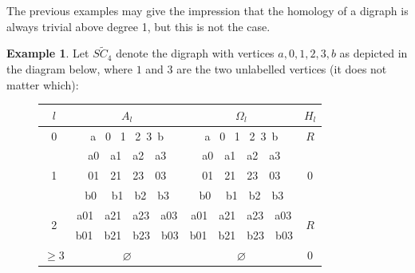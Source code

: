 \documentclass[11pt]{article}
\theoremstyle{definition}
\newtheorem{example}[theo]{Example}
\numberwithin{equation}{section}
\begin{document}
The previous examples may give the impression that the homology of a digraph is always trivial above degree 1, but this is not the case. 
\begin{example}\label{ex:suspension} 
Let $S\tilde C_4$ denote the digraph with vertices $a, 0, 1, 2, 3, b$ as depicted in the diagram below, where $1$ and $3$ are the two unlabelled vertices (it does not matter which):

    \begin{figure}[H]
        \centering
     \end{figure}
     \begin{figure}[H]
        \centering
        \begin{tabular}{||c||  c | c | c ||} 
         \hline
         $l$ &  $A_l$ & $\Omega_l$ & $H_l$ \\ [.5ex] 
         \hline\hline
        0 &  a \, 0 \, 1 \, 2 \,3\, b & a \, 0 \, 1 \, 2 \,3\, b & $R$ \\ 
         \hline
          & a0\,\,\,\, a1\,\,\,\, a2 \,\,\,\,a3 & a0\,\,\,\, a1\,\,\,\, a2 \,\,\,\,a3 & \\ 
          1 & 01\,\,\,\, 21\,\,\,\, 23 \,\,\,\,03 & 01\,\,\,\, 21\,\,\,\, 23 \,\,\,\,03 & 0\\ 
          & b0 \,\,\,\, b1\,\,\,\, b2\,\,\,\, b3 & b0 \,\,\,\, b1\,\,\,\, b2\,\,\,\, b3 &  \\
         \hline
          \multirow{2}{*}{2} & a01\,\,\,\, a21\,\,\,\, a23 \,\,\,\,a03 & a01\,\,\,\, a21\,\,\,\, a23 \,\,\,\,a03 & \multirow{2}{*}{$R$}\\
            & b01\,\,\,\, b21\,\,\,\, b23 \,\,\,\,b03 & b01\,\,\,\, b21\,\,\,\, b23 \,\,\,\,b03 & \\
         \hline
          $\geq 3$ & $\varnothing$ & $\varnothing$ & 0 \\
         \hline
        \end{tabular}
    \end{figure}  


\end{example}
\end{document}
